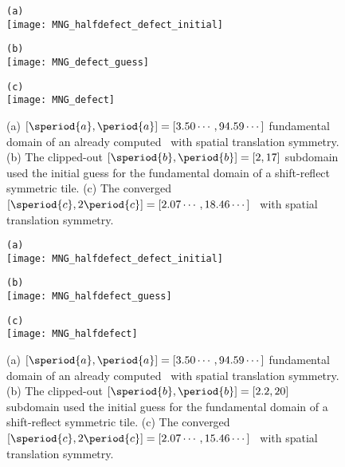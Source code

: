 \begin{figure}
\begin{minipage}[height=.4\textheight]{.5\textwidth}
\centering \small{\texttt{(a)}}\\
\texttt{[image: MNG\_halfdefect\_defect\_initial]}
\end{minipage}
\begin{minipage}[height=.4\textheight]{.5\textwidth}
\centering \small{\texttt{(b)}}\\
\texttt{[image: MNG\_defect\_guess]}
\end{minipage}
\begin{minipage}[height=.1\textheight]{\textwidth}
\centering \small{\texttt{(c)}}\\
\texttt{[image: MNG\_defect]}
\end{minipage}
\caption{ \label{fig:defect}
(a)
$[\speriod{a},\period{a}]=[3.50\cdots,94.59\cdots]$ fundamental domain
of an already computed \twot\ with spatial translation symmetry.
(b)
The clipped-out $[\speriod{b},\period{b}]=[2,17]$ subdomain used the
initial guess for the fundamental domain of a shift-reflect symmetric tile.
(c)
The converged $[\speriod{c},2\period{c}]=[2.07\cdots,18.46\cdots]$ \twot\
with spatial translation symmetry.
}
\end{figure}

\begin{figure}
\begin{minipage}[height=.4\textheight]{.5\textwidth}
\centering \small{\texttt{(a)}}\\
\texttt{[image: MNG\_halfdefect\_defect\_initial]}
\end{minipage}
\begin{minipage}[height=.4\textheight]{.5\textwidth}
\centering \small{\texttt{(b)}}\\
\texttt{[image: MNG\_halfdefect\_guess]}
\end{minipage}
\begin{minipage}[height=.1\textheight]{\textwidth}
\centering \small{\texttt{(c)}}\\
\texttt{[image: MNG\_halfdefect]}
\end{minipage}
\caption{ \label{fig:halfdefect}
(a)
$[\speriod{a},\period{a}]=[3.50\cdots,94.59\cdots]$ fundamental domain
of an already computed \twot\ with spatial translation symmetry.
(b)
The clipped-out $[\speriod{b},\period{b}]=[2.2,20]$ subdomain used the
initial guess for the fundamental domain of a shift-reflect symmetric tile.
(c)
The converged $[\speriod{c},2\period{c}]=[2.07\cdots,15.46\cdots]$ \twot\
with spatial translation symmetry.
}
\end{figure}

